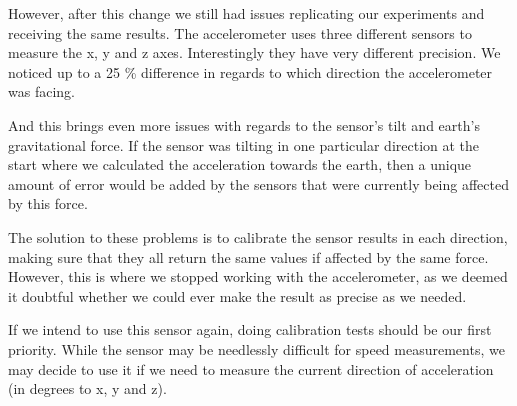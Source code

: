 However, after this change we still had issues replicating our experiments and receiving the same results. The accelerometer uses three different sensors to measure the x, y and z axes. Interestingly they have very different precision. We noticed up to a 25 \% difference in regards to which direction the accelerometer was facing. 

And this brings even more issues with regards to the sensor's tilt and earth's gravitational force. If the sensor was tilting in one particular direction at the start where we calculated the acceleration towards the earth, then a unique amount of error would be added by the sensors that were currently being affected by this force. 

The solution to these problems is to calibrate the sensor results in each direction, making sure that they all return the same values if affected by the same force. However, this is where we stopped working with the accelerometer, as we deemed it doubtful whether we could ever make the result as precise as we needed.

If we intend to use this sensor again, doing calibration tests should be our first priority. While the sensor may be needlessly difficult for speed measurements, we may decide to use it if we need to measure the current direction of acceleration (in degrees to x, y and z). 



